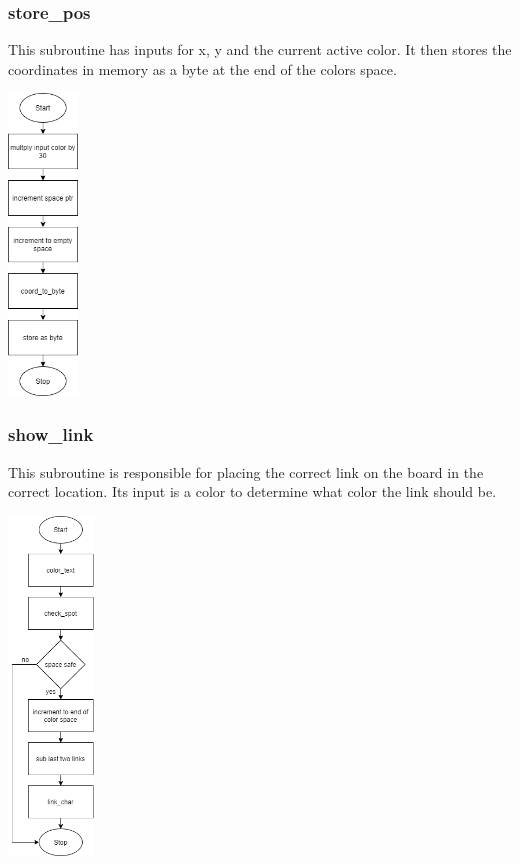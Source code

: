\documentclass{article}
\begin{document}
    \subsubsection{store\_pos}
        This subroutine has inputs for x, y and the current active color.
        It then stores the coordinates in memory as a byte at the end of 
        the colors space.
        \begin{center}
            {\includegraphics[height=8cm]{store_pos.png}\centering} 
        \end{center}
        \newpage

    \subsubsection{show\_link}
        This subroutine is responsible for placing the correct link
        on the board in the correct location.  Its input is a color
        to determine what color the link should be.
        \begin{center}
            {\includegraphics[height=9cm]{show_link.png}\centering} 
        \end{center}
        \newpage
\end{document}
